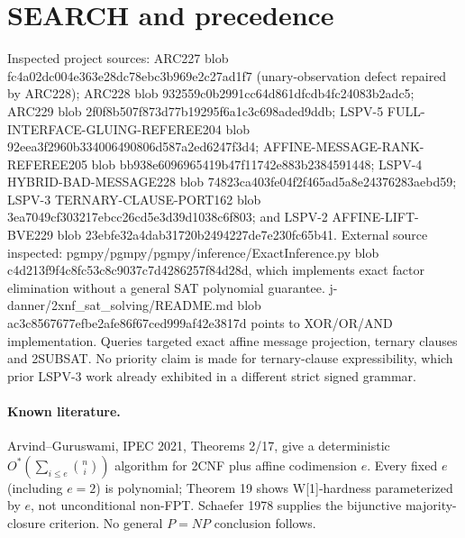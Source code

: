 \documentclass[11pt]{article}
\begin{document}
\section{SEARCH and precedence}
Inspected project sources: ARC227 blob fc4a02dc004e363e28dc78ebc3b969e2c27ad1f7 (unary-observation defect repaired by ARC228); ARC228 blob 932559c0b2991cc64d861dfcdb4fc24083b2adc5; ARC229 blob 2f0f8b507f873d77b19295f6a1c3c698aded9ddb; LSPV-5 FULL-INTERFACE-GLUING-REFEREE204 blob 92eea3f2960b334006490806d587a2ed6247f3d4; AFFINE-MESSAGE-RANK-REFEREE205 blob bb938e6096965419b47f11742e883b2384591448; LSPV-4 HYBRID-BAD-MESSAGE228 blob 74823ca403fe04f2f465ad5a8e24376283aebd59; LSPV-3 TERNARY-CLAUSE-PORT162 blob 3ea7049cf303217ebcc26cd5e3d39d1038c6f803; and LSPV-2 AFFINE-LIFT-BVE229 blob 23ebfe32a4dab31720b2494227de7e230fc65b41. External source inspected: pgmpy/pgmpy/pgmpy/inference/ExactInference.py blob c4d213f9f4c8fc53c8c9037c7d4286257f84d28d, which implements exact factor elimination without a general SAT polynomial guarantee. j-danner/2xnf_sat_solving/README.md blob ac3c8567677efbe2afe86f67ced999af42e3817d points to XOR/OR/AND implementation. Queries targeted exact affine message projection, ternary clauses and 2SUBSAT. No priority claim is made for ternary-clause expressibility, which prior LSPV-3 work already exhibited in a different strict signed grammar.
\paragraph{Known literature.}
Arvind--Guruswami, IPEC 2021, Theorems 2/17, give a deterministic $O^*(\sum_{i\le e}\binom ni)$ algorithm for 2CNF plus affine codimension $e$. Every fixed $e$ (including $e=2$) is polynomial; Theorem 19 shows W[1]-hardness parameterized by $e$, not unconditional non-FPT. Schaefer 1978 supplies the bijunctive majority-closure criterion. No general $P=NP$ conclusion follows.
\end{document}

